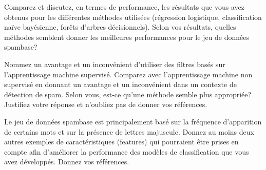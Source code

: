 	\begin{homeworkProblem}[Performance et optimisation]
	

		\begin{homeworkSection}{2.1}

			Comparez et discutez, en termes de performance, les résultats que vous avez obtenus
			pour les différentes méthodes utilisées (régression logistique, classification naïve
			bayésienne, forêts d’arbres décisionnels). Selon vos résultats, quelles méthodes semblent
			donner les meilleures performances pour le jeu de données spambase?\\

			\problemAnswer{
			
			}
			
		\end{homeworkSection}
		
		\begin{homeworkSection}{2.2}
			
			Nommez un avantage et un inconvénient d’utiliser des filtres basés sur
			l’apprentissage machine supervisé. Comparez avec l’apprentissage machine non
			supervisé en donnant un avantage et un inconvénient dans un contexte de détection de
			spam. Selon vous, est-ce qu’une méthode semble plus appropriée? Justifiez votre réponse
			et n’oubliez pas de donner vos références.\\
	
			\problemAnswer{
			
			}
			
		\end{homeworkSection}
			
		\begin{homeworkSection}{2.3}

			Le jeu de données spambase est principalement basé sur la fréquence d’apparition de
			certains mots et sur la présence de lettres majuscule. Donnez au moins deux autres
			exemples de caractéristiques (features) qui pourraient être prises en compte afin
			d’améliorer la performance des modèles de classification que vous avez développés.
			Donnez vos références. \\

					
		\end{homeworkSection}
		
			
	\end{homeworkProblem}